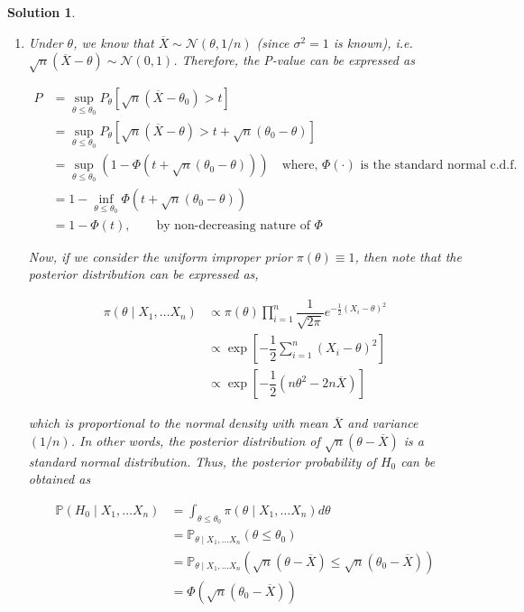 \documentclass[12pt]{article}
\theoremstyle{problemstyle}
\newtheorem*{solution*}{Solution}
\newcommand{\prob}{\mathbb{P}}
\newcommand{\normal}{\mathcal{N}}
\begin{document}
\begin{solution*}
    \begin{enumerate}
        \item[(a)] Under $\theta$, we know that $\overline{X} \sim \normal(\theta, 1/n)$ (since $\sigma^2 = 1$ is known), i.e. $\sqrt{n}(\overline{X} - \theta) \sim \normal(0, 1)$. Therefore, the P-value can be expressed as 
        
        \begin{align*}
            P 
            & = \sup_{\theta \leq \theta_0} P_{\theta}[\sqrt{n}(\overline{X} - \theta_0) > t]\\
            & = \sup_{\theta \leq \theta_0} P_{\theta}[\sqrt{n}(\overline{X} - \theta) > t + \sqrt{n}(\theta_0 - \theta)]\\
            & = \sup_{\theta \leq \theta_0} \left( 1 - \Phi(t + \sqrt{n}(\theta_0 - \theta))  \right) \quad \text{where, } \Phi(\cdot) \text{ is the standard normal c.d.f.}\\
            & = 1 -\inf_{\theta \leq \theta_0}  \Phi\left( t + \sqrt{n}(\theta_0 - \theta) \right)\\
            & = 1 - \Phi(t), \qquad \text{by non-decreasing nature of } \Phi
        \end{align*}

        Now, if we consider the uniform improper prior $\pi(\theta) \equiv 1$, then note that the posterior distribution can be expressed as,

        \begin{align*}
            \pi(\theta \mid X_1, \dots X_n)
            & \propto \pi(\theta) \prod_{i=1}^n \dfrac{1}{\sqrt{2\pi}} e^{-\frac{1}{2}(X_i - \theta)^2}\\
            & \propto \exp\left[ -\dfrac{1}{2}\sum_{i=1}^n (X_i - \theta)^2 \right]\\
            & \propto \exp\left[ -\dfrac{1}{2} (n\theta^2 - 2n\overline{X}) \right]
        \end{align*}

        which is proportional to the normal density with mean $\overline{X}$ and variance $(1/n)$. In other words, the posterior distribution of $\sqrt{n}(\theta - \overline{X})$ is a standard normal distribution. Thus, the posterior probability of $H_0$ can be obtained as 

        \begin{align*}
            \prob(H_0 \mid X_1, \dots X_n)
            & = \int_{\theta \leq \theta_0} \pi(\theta\mid X_1, \dots X_n) d\theta\\
            & = \prob_{\theta \mid X_1, \dots X_n}\left( \theta \leq \theta_0 \right)\\
            & = \prob_{\theta \mid X_1, \dots X_n}\left( \sqrt{n}(\theta - \overline{X}) \leq \sqrt{n}(\theta_0 - \overline{X}) \right)\\
            & = \Phi\left(\sqrt{n}(\theta_0 - \overline{X}) \right)\\
        \end{align*}


\end{enumerate}
\end{solution*}
\end{document}
